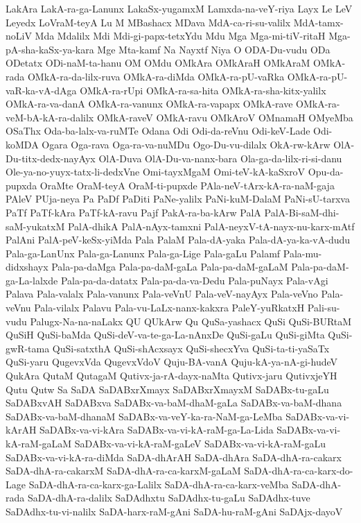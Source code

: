 {LakAra
LakA-ra-ga-Lanunx
LakaSx-yugamxM
Lamxda-na-veY-riya
Layx
Le
LeV
Leyedx
LoVraM-teyA
Lu
M
MBashacx
MDava
MdA-ca-ri-su-valilx
MdA-tamx-noLiV
Mda
Mdalilx
Mdi
Mdi-gi-papx-tetxYdu
Mdu
Mga
Mga-mi-tiV-ritaH
Mga-pA-sha-kaSx-ya-kara
Mge
Mta-kamf
Na
Nayxtf
Niya
O
ODA-Du-vudu
ODa
ODetatx
ODi-naM-ta-hanu
OM
OMdu
OMkAra
OMkAraH
OMkAraM
OMkA-rada
OMkA-ra-da-lilx-ruva
OMkA-ra-diMda
OMkA-ra-pU-vaRka
OMkA-ra-pU-vaR-ka-vA-dAga
OMkA-ra-rUpi
OMkA-ra-sa-hita
OMkA-ra-sha-kitx-yalilx
OMkA-ra-va-danA
OMkA-ra-vanunx
OMkA-ra-vapapx
OMkA-rave
OMkA-ra-veM-bA-kA-ra-dalilx
OMkA-raveV
OMkA-ravu
OMkAroV
OMnamaH
OMyeMba
OSaThx
Oda-ba-lalx-va-ruMTe
Odana
Odi
Odi-da-reVnu
Odi-keV-Lade
Odi-koMDA
Ogara
Oga-rava
Oga-ra-va-nuMDu
Ogo-Du-vu-dilalx
OkA-rw-kArw
OlA-Du-titx-dedx-nayAyx
OlA-Duva
OlA-Du-va-nanx-bara
Ola-ga-da-lilx-ri-si-danu
Ole-ya-no-yuyx-tatx-li-dedxVne
Omi-tayxMgaM
Omi-teV-kA-kaSxroV
Opu-da-pupxda
OraMte
OraM-teyA
OraM-ti-pupxde
PAla-neV-tArx-kA-ra-naM-gaja
PAleV
PUja-neya
Pa
PaDf
PaDiti
PaNe-yalilx
PaNi-kuM-DalaM
PaNi-sU-tarxva
PaTf
PaTf-kAra
PaTf-kA-ravu
Pajf
PakA-ra-ba-kArw
PalA
PalA-Bi-saM-dhi-saM-yukatxM
PalA-dhikA
PalA-nAyx-tamxni
PalA-neyxV-tA-nayx-nu-karx-mAtf
PalAni
PalA-peV-keSx-yiMda
Pala
PalaM
Pala-dA-yaka
Pala-dA-ya-ka-vA-dudu
Pala-ga-LanUnx
Pala-ga-Lanunx
Pala-ga-Lige
Pala-gaLu
Palamf
Pala-mu-didxshayx
Pala-pa-daMga
Pala-pa-daM-gaLa
Pala-pa-daM-gaLaM
Pala-pa-daM-ga-La-lalxde
Pala-pa-da-datatx
Pala-pa-da-va-Dedu
Pala-puNayx
Pala-vAgi
Palava
Pala-valalx
Pala-vanunx
Pala-veVnU
Pala-veV-nayAyx
Pala-veVno
Pala-veVnu
Pala-vilalx
Palavu
Pala-vu-LaLx-nanx-kakxra
PaleY-yuRkatxH
Pali-su-vudu
Palugx-Na-na-naLakx
QU
QUkArw
Qu
QuSa-yashacx
QuSi
QuSi-BURtaM
QuSiH
QuSi-baMda
QuSi-deV-va-te-ga-La-nAnxDe
QuSi-gaLu
QuSi-giMta
QuSi-gwR-tama
QuSi-satxthA
QuSi-shAcxsayx
QuSi-shecxYva
QuSi-ta-ti-yaSaTx
QuSi-yaru
QugevxVda
QugevxVdoV
Quju-BA-vanA
Quju-kA-ya-nA-gi-hudeV
QukAra
QutaM
QutagaM
Qutivx-ja-rA-dayx-naMta
Qutivx-jaru
QutivxjeYH
Qutu
Qutw
Sa
SaDA
SaDABxrXmayx
SaDABxrXmayxM
SaDABx-tu-gaLu
SaDABxvAH
SaDABxva
SaDABx-va-baM-dhaM-gaLa
SaDABx-va-baM-dhana
SaDABx-va-baM-dhanaM
SaDABx-va-veY-ka-ra-NaM-ga-LeMba
SaDABx-va-vi-kArAH
SaDABx-va-vi-kAra
SaDABx-va-vi-kA-raM-ga-La-Lida
SaDABx-va-vi-kA-raM-gaLaM
SaDABx-va-vi-kA-raM-gaLeV
SaDABx-va-vi-kA-raM-gaLu
SaDABx-va-vi-kA-ra-diMda
SaDA-dhArAH
SaDA-dhAra
SaDA-dhA-ra-cakarx
SaDA-dhA-ra-cakarxM
SaDA-dhA-ra-ca-karxM-gaLaM
SaDA-dhA-ra-ca-karx-do-Lage
SaDA-dhA-ra-ca-karx-ga-Lalilx
SaDA-dhA-ra-ca-karx-veMba
SaDA-dhA-rada
SaDA-dhA-ra-dalilx
SaDAdhxtu
SaDAdhx-tu-gaLu
SaDAdhx-tuve
SaDAdhx-tu-vi-nalilx
SaDA-harx-raM-gAni
SaDA-hu-raM-gAni
SaDAjx-dayoV
}
